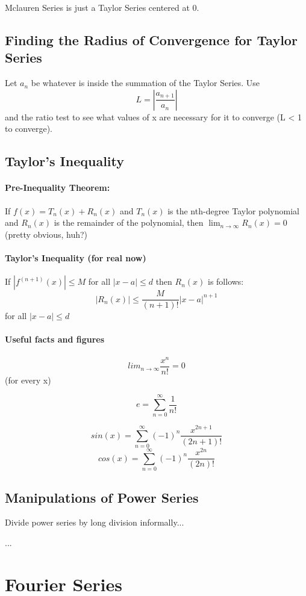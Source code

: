 \documentclass[a4paper,12pt]{report}
\begin{document}
Mclauren Series is just a Taylor Series centered at 0.

\subsection{Finding the Radius of Convergence for Taylor Series}
Let $a_n$ be whatever is inside the summation of the Taylor Series. Use $$L = |\frac{a_{n+1}}{a_n}|$$ and the ratio test to see what values of x are necessary for it to converge (L < 1 to converge).

\subsection{Taylor's Inequality}
\paragraph{Pre-Inequality Theorem: } If $f(x) = T_n(x) + R_n(x)$ and $T_n(x)$ is the nth-degree Taylor polynomial and $R_n(x)$ is the remainder of the polynomial, then $\lim_{n \to \infty} R_n(x) = 0$ (pretty obvious, huh?)

\paragraph{Taylor's Inequality (for real now)}
If $|f^{(n+1)}(x)| 	\leq M$ for all $|x-a| \leq d$ then $R_n(x)$ is follows:
$$|R_n(x)| \leq \frac{M}{(n+1)!} |x-a|^{n+1}$$ for all $|x-a| \leq d$

\paragraph{Useful facts and figures}
$$lim_{n \to \infty} \frac{x^n}{n!} = 0$$
(for every x)


$$e = \sum_{n = 0}^{\infty} \frac{1}{n!}$$

$$sin(x) = \sum_{n=0}^{\infty}(-1)^n \frac{x^{2n+1}}{(2n+1)!}$$
$$cos(x) = \sum_{n=0}^{\infty}(-1)^n \frac{x^{2n}}{(2n)!}$$

\subsection{Manipulations of Power Series}
Divide power series by long division informally...

...


\section{Fourier Series}
\end{document}
